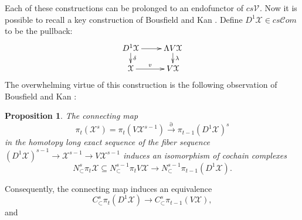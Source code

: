 \documentclass[11pt]{amsart}
\theoremstyle{plain}
\newtheorem{prop}[thm]{Proposition}
\theoremstyle{definition}
\renewcommand{\to}{\longrightarrow}
\newcommand{\scrC}{\mathscr{C}}
\newcommand{\calX}{\mathcal{X}}
\newcommand{\calV}{\mathcal{V}}
\theoremstyle{plain}
\newcommand{\vect}[2]{\calV^{#1}_{#2}}
\newcommand{\algs}{{\scrC\!\textit{om}}}
\begin{document}
\begin{Operations on the Bousfield-Kan spectral sequence}
\begin{shaded}
Each of these constructions can be prolonged to an endofunctor of $cs\vect{}{}$. 
Now it is possible to recall a key construction of Bousfield and Kan \cite{BK_pairings_products.pdf,BK_pairings.pdf}. Define $D^1\calX \in cs\algs$ to be the pullback:
\[\xymatrix@R=4mm{
D^1\calX \ar[r]
\ar[d]^-{\delta}
&%
\Lambda V\calX \ar[d]^-{\lambda}
\\%
\calX \ar[r]^-{v}
&%
V\calX %
}\]
The overwhelming virtue of this construction is the following observation of Bousfield and Kan \cite[Proposition 5.2]{BK_pairings_products.pdf}:
\begin{prop}\label{BK D1 is awesome}
The connecting map
\[\pi_t(\calX^{s})=\pi_t(V\calX^{s-1})\overset{\partial }{\to}\pi_{t-1}(D^1\calX)^s\]
in the homotopy long exact sequence of the fiber sequence $(D^1\calX)^{s-1}\to \calX^{s-1}\to V\calX^{s-1}$ induces an isomorphism of cochain complexes
\[N^s_\subset \pi_t \calX\subseteq N^{s-1}_\subset \pi_t V\calX \to  N^{s-1}_\subset \pi_{t-1} (D^1\calX).\]
\end{prop}
Consequently, the connecting map induces an equivalence
\[C^s_\subset \pi_t (D^1\calX)\to  C^s_\subset \pi_{t-1} (V\calX),\]
and 
\end{shaded}


\end{Operations on the Bousfield-Kan spectral sequence}
\end{document}
